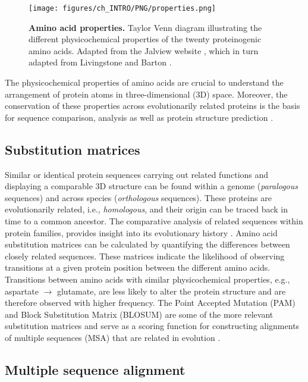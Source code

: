 \begin{figure}[htb!]
    \centering
    \texttt{[image: figures/ch\_INTRO/PNG/properties.png]}
    \caption[Amino acid properties]{\textbf{Amino acid properties.} Taylor Venn diagram illustrating the different physicochemical properties of the twenty proteinogenic amino acids. Adapted from the Jalview website \cite{JALVIEW}, which in turn adapted from Livingstone and Barton \cite{LIVINGSTONE_1993_MSA}.}
    \label{fig:properties}
\end{figure}

The physicochemical properties of amino acids are crucial to understand the arrangement of protein atoms in three-dimensional (3D) space. Moreover, the conservation of these properties across evolutionarily related proteins is the basis for sequence comparison, analysis as well as protein structure prediction \cite{CHOTHIA_1986_CONSERVATION}.

\subsection{Substitution matrices}

Similar or identical protein sequences carrying out related functions and displaying a comparable 3D structure can be found within a genome (\textit{paralogous} sequences) and across species (\textit{orthologous} sequences). These proteins are evolutionarily related, i.e., \textit{homologous}, and their origin can be traced back in time to a common ancestor. The comparative analysis of related sequences within protein families, provides insight into its evolutionary history \cite{BARTON_1990_MSA}. Amino acid substitution matrices can be calculated by quantifying the differences between closely related sequences. These matrices indicate the likelihood of observing transitions at a given protein position between the different amino acids. Transitions between amino acids with similar physicochemical properties, e.g., aspartate $\rightarrow$ glutamate, are less likely to alter the protein structure and are therefore observed with higher frequency. The Point Accepted Mutation (PAM) \cite{DAYHOFF_1978_PAM} and Block Substitution Matrix (BLOSUM) \cite{HENIKOFF_1992_BLOSUM} are some of the more relevant substitution matrices and serve as a scoring function for constructing alignments of multiple sequences (MSA) that are related in evolution \cite{BARTON_1987_MSA}.

\subsection{Multiple sequence alignment}

